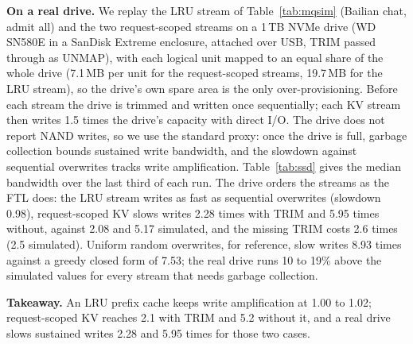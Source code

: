 \documentclass[acmsmall,screen,review]{acmart}
\begin{document}
\textbf{On a real drive.} We replay the LRU stream of Table~\ref{tab:mqsim} (Bailian chat, admit
all) and the two request-scoped streams on a 1\,TB NVMe drive (WD SN580E in a SanDisk
Extreme enclosure, attached over USB, TRIM passed through as UNMAP), with each logical unit
mapped to an equal share of the whole drive (7.1\,MB per unit for the request-scoped streams, 19.7\,MB
for the LRU stream), so the drive's own spare area is the only over-provisioning. Before each stream the
drive is trimmed and written once sequentially; each KV stream then writes 1.5 times the drive's
capacity with direct I/O. The drive does not report NAND writes, so we use the standard proxy: once the drive
is full, garbage collection bounds sustained write bandwidth, and the slowdown against sequential
overwrites tracks write amplification. Table~\ref{tab:ssd} gives the median bandwidth over the last
third of each run. The drive orders the streams as the FTL does: the LRU stream writes as fast as
sequential overwrites (slowdown 0.98), request-scoped KV slows writes 2.28 times with TRIM and 5.95
times without, against 2.08 and 5.17 simulated, and the missing TRIM costs 2.6 times (2.5 simulated).
Uniform random overwrites, for reference, slow writes 8.93 times against a greedy closed form of 7.53;
the real drive runs 10 to 19\% above the simulated values for every stream that needs garbage
collection.

\begin{table}[t]
\caption{Real drive (1\,TB WD SN580E over USB): steady host write bandwidth with the drive full,
slowdown against sequential overwrites, and the write amplification of our FTL for the same stream
at 7\% over-provisioning (uniform random: greedy closed form). One run per stream; median and
interquartile range of 10-second samples over the last third of the run.}
\label{tab:ssd}
\small

\end{table}

\textbf{Takeaway.} An LRU prefix cache keeps write amplification at 1.00 to 1.02; request-scoped KV
reaches 2.1 with TRIM and 5.2 without it, and a real drive slows sustained writes 2.28 and 5.95 times
for those two cases.
\end{document}
